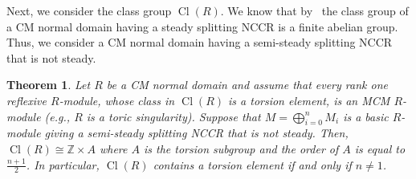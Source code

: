 \documentclass[11pt]{amsart}
\newtheorem{theo}{Theorem}[section]
\theoremstyle{definition}
\newcommand{\ZZ}{\mathbb{Z}}
\DeclareMathOperator{\Cl}{Cl}
\begin{document}

Next, we consider the class group $\Cl(R)$. We know that by~\cite[Proposition~2.8]{IN} the class group of a CM normal domain having a steady splitting NCCR is a finite abelian group. Thus, we consider a CM normal domain having a semi-steady splitting NCCR that is not steady.

\begin{theo}\label{class_semi_steady}
Let $R$ be a CM normal domain and assume that every rank one reflexive $R$-module, whose class in $\Cl(R)$ is a torsion element, is an MCM $R$-module (e.g., $R$ is a toric singularity). Suppose that $M=\bigoplus_{i=0}^nM_i$ is a basic $R$-module giving a semi-steady splitting NCCR that is not steady. Then, $\Cl(R)\cong\ZZ\times A$ where $A$ is the torsion subgroup and the order of $A$ is equal to $\frac{n+1}{2}$. In particular, $\Cl(R)$ contains a torsion element if and only if $n\neq 1$.
\end{theo}
\end{document}
